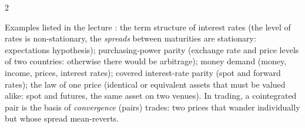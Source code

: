 \begin{paracol}{2}
\begin{finance}\label{ch09:fin-coint}
Examples listed in the lecture : the term structure of interest rates (the level of rates is non-stationary, the
\emph{spreads} between maturities are stationary: expectations hypothesis); purchasing-power parity (exchange rate and price levels of two countries: otherwise there would be arbitrage);
money demand (money, income, prices, interest rates); covered interest-rate parity (spot and forward rates); the law of one price (identical or equivalent
assets that must be valued alike: spot and futures, the same asset on two venues). In trading, a cointegrated pair is the basis of
\emph{convergence} (pairs) trades: two prices that wander individually but whose spread mean-reverts.
\end{finance}


\end{paracol}

